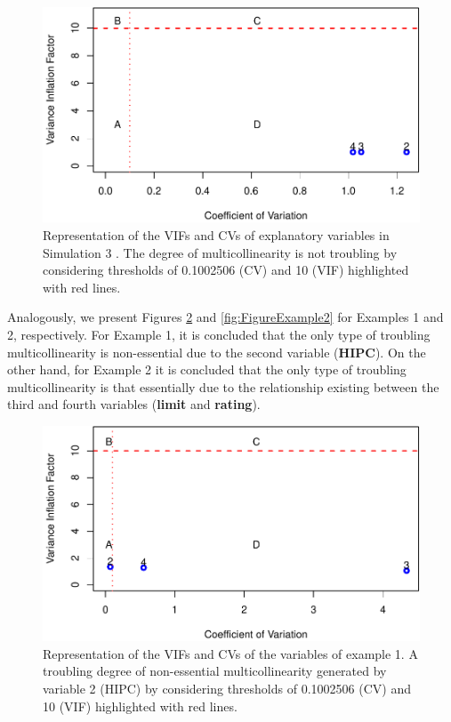 \begin{figure}
\centering
\includegraphics{salmeron-etal_files/figure-latex/FigureS3-1.pdf}
\caption{\label{fig:FigureS3}Representation of the VIFs and CVs of explanatory variables in Simulation 3 . The degree of multicollinearity is not troubling by considering thresholds of 0.1002506 (CV) and 10 (VIF) highlighted with red lines.}
\end{figure}

Analogously, we present Figures \ref{fig:FigureExample1} and \ref{fig:FigureExample2} for Examples 1 and 2, respectively. For Example 1, it is concluded that the only type of troubling multicollinearity is non-essential due to the second variable (\textbf{HIPC}). On the other hand, for Example 2 it is concluded that the only type of troubling multicollinearity is that essentially due to the relationship existing between the third and fourth variables (\textbf{limit} and \textbf{rating}).

\begin{figure}
\centering
\includegraphics{salmeron-etal_files/figure-latex/FigureExample1-1.pdf}
\caption{\label{fig:FigureExample1}Representation of the VIFs and CVs of the variables of example 1. A troubling degree of non-essential multicollinearity generated by variable 2 (HIPC) by considering thresholds of 0.1002506 (CV) and 10 (VIF) highlighted with red lines.}
\end{figure}

